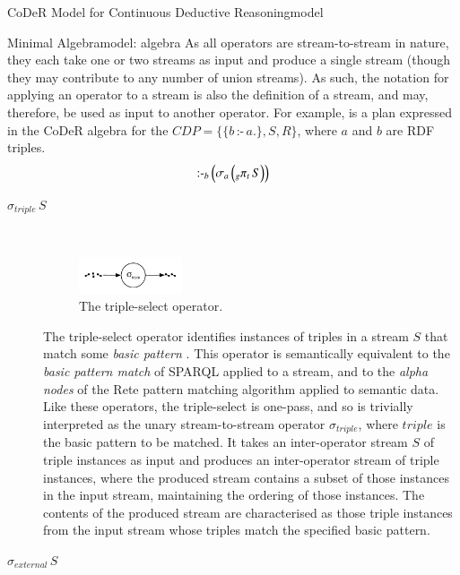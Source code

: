 \begin{nestedsection}{CoDeR Model for Continuous Deductive Reasoning}{model}
\begin{nestedsection}{Minimal Algebra}{model: algebra}
		As all operators are stream-to-stream in nature, they each take one or two streams as input and produce a single stream (though they may contribute to any number of union streams).
		As such, the notation for applying an operator to a stream is also the definition of a stream, and may, therefore, be used as input to another operator.
		For example,  is a plan expressed in the CoDeR algebra for the ${CDP = \{ \{b\,\text{:-}\,a.\}, S, R \}}$, where $a$ and $b$ are RDF triples.
		\begin{equation}\labeleqn{basic-example-plan}
			\text{:-}_b \left( \sigma_a \left( {}_g{\pi_t}\,S \right) \right)
		\end{equation}

		\begin{description}
			\item[$\sigma_{triple}\,S$] \hfill \\
				\begin{figure}[t]
					\centering
					\includegraphics[width=0.3\textwidth]{basic-pattern-match}
					\caption{The triple-select operator.}
				\end{figure}
				The triple-select operator identifies instances of triples in a stream $S$ that match some \emph{basic pattern} \citep{w3csparql}.
				This operator is semantically equivalent to the \emph{basic pattern match} of SPARQL applied to a stream, and to the \emph{alpha nodes} of the Rete pattern matching algorithm \citep{forgy79} applied to semantic data.
				Like these operators, the triple-select is one-pass, and so is trivially interpreted as the unary stream-to-stream operator $\sigma_{triple}$, where ${triple}$ is the basic pattern to be matched.
				It takes an inter-operator stream $S$ of triple instances as input and produces an inter-operator stream of triple instances, where the produced stream contains a subset of those instances in the input stream, maintaining the ordering of those instances.
				The contents of the produced stream are characterised as those triple instances from the input stream whose triples match the specified basic pattern.
			\item[$\sigma_{external}\,S$] \hfill \\
				\begin{figure}[b]

\end{figure}
\end{description}
\end{nestedsection}
\end{nestedsection}
